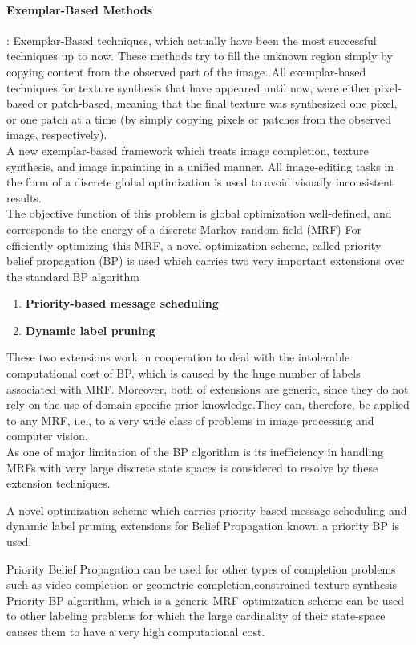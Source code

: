\paragraph{Exemplar-Based Methods} : Exemplar-Based techniques, which actually have been the most successful techniques up to now. These methods try to fill the unknown region simply
by copying content from the observed part of the image. All exemplar-based techniques for texture synthesis
that have appeared until now, were either pixel-based or patch-based, meaning that the final texture
was synthesized one pixel, or one patch at a time (by simply copying pixels or patches from the observed image, respectively).
\\ A new exemplar-based framework  which treats image completion, texture synthesis, and image inpainting in a unified manner. All   image-editing tasks in the form of a discrete global optimization is used to avoid visually inconsistent results.
\\ The objective function of this problem is global optimization well-defined, and corresponds to the energy of a discrete Markov random field (MRF)
For efficiently optimizing this MRF, a novel optimization scheme, called priority belief propagation (BP) is used  which carries two very important extensions over the standard BP algorithm

  \begin{enumerate}
  \item \textbf{Priority-based message scheduling}
  \item \textbf{Dynamic label pruning}
\end{enumerate}

These two extensions work in cooperation to deal with the intolerable computational cost of BP, which is caused by the huge number of labels associated with  MRF. Moreover, both of  extensions are generic, since they do not rely on the use of domain-specific prior knowledge.They can, therefore, be applied to any MRF, i.e., to a very wide class of problems in image processing and computer vision.\\As one of  major limitation of the BP algorithm  is  its inefficiency in handling MRFs with very large discrete state spaces is considered to resolve by these extension techniques.

A novel optimization scheme which carries priority-based message scheduling and dynamic label pruning extensions for Belief Propagation known a priority BP is used.

Priority Belief Propagation  can be used for other types of completion problems such as video completion or geometric completion,constrained texture synthesis
\\ Priority-BP algorithm, which is a generic MRF optimization scheme can be used to other labeling problems  for which the large cardinality of their state-space causes them
to have a very high computational cost.


